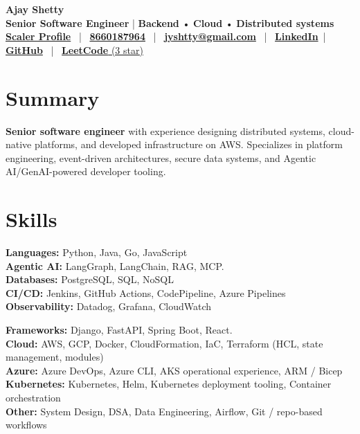 \documentclass[11 pt]{article}
\begin{document}
\begin{center}
    {\LARGE \textbf{Ajay Shetty}} \\[4pt]
    \textbf{Senior Software Engineer} | \textbf{Backend} • \textbf{Cloud} • \textbf{ Distributed systems} \\[6pt]

    \href{https://www.scaler.com/academy/profile/e30cd4a603ce/}{\textbf{Scaler Profile}} \, | \,
    \href{tel:8660187964}{\textbf{8660187964}} \, | \,
    \href{mailto:jyshtty@gmail.com}{\textbf{jyshtty@gmail.com}} \, | \,
    \href{https://www.linkedin.com/in/ajay-shetty-2b5901ab/}{\textbf{LinkedIn}} \,|\,
    \href{https://github.com/jyshtty}{\textbf{GitHub}} \, | \,
    \href{https://leetcode.com/u/jyshtty/}{\textbf{LeetCode} (3 star)}
\end{center}

\section*{\textbf{Summary}}
\textbf{Senior software engineer}  with experience designing distributed systems, cloud-native platforms, and developed infrastructure on AWS. Specializes in platform engineering, event-driven architectures, secure data systems, and Agentic AI/GenAI-powered developer tooling.



\section*{\textbf{Skills}}

\noindent
\begin{minipage}[t]{0.48\textwidth}
\textbf{Languages:} Python, Java, Go, JavaScript \\[1pt]
\textbf{Agentic AI:} LangGraph, LangChain, RAG, MCP. \\[1pt]
\textbf{Databases:} PostgreSQL, SQL, NoSQL \\[1pt]
\textbf{CI/CD:} Jenkins, GitHub Actions, CodePipeline, Azure Pipelines \\[1pt]
\textbf{Observability:} Datadog, Grafana, CloudWatch
\end{minipage}
\hfill
\begin{minipage}[t]{0.48\textwidth}
\textbf{Frameworks:} Django, FastAPI, Spring Boot, React.  \\[1pt]
\textbf{Cloud:} AWS, GCP, Docker, CloudFormation, IaC, Terraform (HCL, state management, modules) \\[1pt]
\textbf{Azure:} Azure DevOps, Azure CLI, AKS operational experience, ARM / Bicep \\[1pt]
\textbf{Kubernetes:} Kubernetes, Helm, Kubernetes deployment tooling, Container orchestration \\[1pt]
\textbf{Other:} System Design, DSA, Data Engineering, Airflow, Git / repo-based workflows
\end{minipage}
\end{document}
